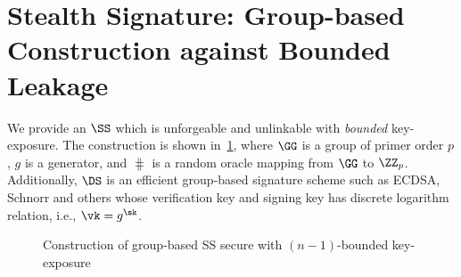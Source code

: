 \section{Stealth Signature: Group-based Construction against Bounded Leakage}
\label{sec:group-bounded}
We provide an $\SS$ which is unforgeable and unlinkable with \emph{bounded} key-exposure. The construction is shown in~\cref{fig:ss-group}, where $\GG$ is a group of primer order $p$, $g$ is a generator, and $\hash$ is a random oracle mapping from $\GG$ to $\ZZ_p$. Additionally, $\DS$ is an efficient group-based signature scheme such as ECDSA, Schnorr and others whose verification key and signing key has discrete logarithm relation, i.e., $\vk=g^\sk$.
\begin{figure}[!t]
    \centering
    \begin{pchstack}[boxed]
    \begin{pcvstack}
    \pcvspace
    \pcvspace
    \end{pcvstack}
    \pchspace
    \begin{pcvstack}
    \pcvspace
    \pcvspace
    \end{pcvstack}
    \end{pchstack}
\caption{Construction of group-based SS secure with $(n-1)$-bounded key-exposure}
\label{fig:ss-group}
\end{figure}

